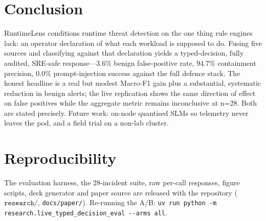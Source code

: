 \documentclass[conference]{IEEEtran}
\begin{document}
\section{Conclusion}
RuntimeLens conditions runtime threat detection on the one thing rule engines lack: an operator declaration of what each workload is supposed to do. Fusing five sources and classifying against that declaration yields a typed-decision, fully audited, SRE-safe response---$3.6\%$ benign false-positive rate, $94.7\%$ containment precision, $0.0\%$ prompt-injection success against the full defence stack. The honest headline is a real but modest Macro-F1 gain plus a substantial, systematic reduction in benign alerts; the live replication shows the same direction of effect on false positives while the aggregate metric remains inconclusive at n=28. Both are stated precisely. Future work: on-node quantised SLMs so telemetry never leaves the pod, and a field trial on a non-lab cluster.

\section*{Reproducibility}
The evaluation harness, the 28-incident suite, raw per-call responses, figure scripts, deck generator and paper source are released with the repository ($\texttt{research/}$, \texttt{docs/paper/}). Re-running the A/B: \texttt{uv run python -m research.live\_typed\_decision\_eval -{-}arms all}.
\end{document}

